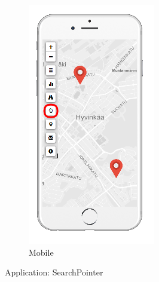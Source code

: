 \begin{figure}[ht]
\begin{subfigure}[b]{0.2\textwidth}
    \includegraphics[width=\textwidth]
      {img/c02-application/png/mobile-basemap-search.png}
    \caption{Mobile}
  \end{subfigure}
  \caption{Application: SearchPointer}
\end{figure}


